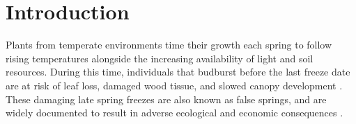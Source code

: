 \documentclass{article}\usepackage[]{graphicx}\usepackage[]{color}
\begin{document}



\section*{Introduction}

Plants from temperate environments time their growth each spring to follow rising temperatures alongside the increasing availability of light and soil resources. During this time, individuals that budburst before the last freeze date are at risk of leaf loss, damaged wood tissue, and slowed canopy development \citep{Gu2008, Hufkens2012}. These damaging late spring freezes are also known as false springs, and are widely documented to result in adverse ecological and economic consequences \citep{Ault2013, Knudson2012}.
\end{document}
